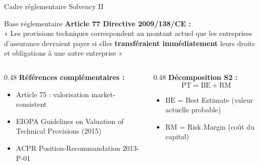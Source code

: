 \documentclass[10pt,aspectratio=169]{beamer}
\newcommand{\highlight}[1]{\textbf{\color{rougeactu}#1}}
\newcommand{\BE}{\text{BE}}
\begin{document}
\begin{frame}{Cadre réglementaire Solvency II}
\begin{block}{Base réglementaire}
\textbf{Article 77 Directive 2009/138/CE :}\\
« Les provisions techniques correspondent au montant actuel que les entreprises d'assurance devraient payer si elles \highlight{transféraient immédiatement} leurs droits et obligations à une autre entreprise »
\end{block}

\vspace{0.3cm}
\begin{columns}[T]
\begin{column}{0.48\textwidth}
\textbf{Références complémentaires :}
\begin{itemize}
    \item Article 75 : valorisation market-consistent
    \item EIOPA Guidelines on Valuation of Technical Provisions (2015)
    \item ACPR Position-Recommandation 2013-P-01
\end{itemize}
\end{column}
\begin{column}{0.48\textwidth}
\textbf{Décomposition S2 :}
\[
\boxed{\text{PT} = \BE + \text{RM}}
\]
\begin{itemize}
    \item $\BE$ = Best Estimate (valeur actuelle probable)
    \item $\text{RM}$ = Risk Margin (coût du capital)
\end{itemize}
\end{column}
\end{columns}
\end{frame}
\end{document}
